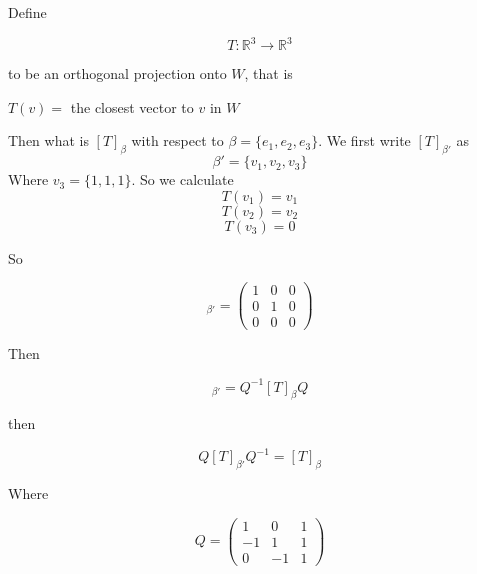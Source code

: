 \documentclass{article}
\newtheorem{one minute paper}[theorem]{One Minute Paper}
\begin{document}
Define 

\begin{equation}
    T: \mathbb{R}^3 \rightarrow \mathbb{R}^3
\end{equation}

to be an orthogonal projection onto $W$, that is 

\begin{center}
    $T(v) = $ the closest vector to $v$ in $W$
\end{center}

Then what is $[T]_\beta$ with respect to $\beta = \{e_1,e_2,e_3\}$. We first write $[T]_{\beta'}$ as 
\begin{equation}
    \beta' = \{v_1,v_2,v_3\}
\end{equation}
Where $v_3 = \{1,1,1\}$. So we calculate 
\begin{equation}
    T(v_1) = v_1
\end{equation}
\begin{equation}
    T(v_2) = v_2
\end{equation}
\begin{equation}
    T(v_3) = 0
\end{equation}

So 

\begin{equation}
    [T]_{\beta'} = \begin{pmatrix}
        1 & 0 & 0 \\
        0 & 1 & 0 \\
        0 & 0 & 0 
    \end{pmatrix}
\end{equation}

Then 

\begin{equation}
    [T]_{\beta'} = Q^{-1}[T]_{\beta}Q
\end{equation}

then

\begin{equation}
    Q[T]_{\beta'}Q^{-1} = [T]_\beta
\end{equation}

Where 

\begin{equation}
    Q = \begin{pmatrix}
        1 & 0 & 1 \\
        -1 & 1 & 1 \\
        0 & -1 & 1
    \end{pmatrix}
\end{equation}
\end{document}
